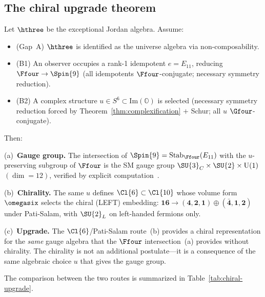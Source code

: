 \subsection{The chiral upgrade theorem}\label{sec:chiral-upgrade}

\begin{theorem}\label{thm:one-choice}
Let $\hthree$ be the exceptional Jordan algebra.  Assume:
\begin{itemize}
  \item \textup{(Gap~A)} $\hthree$ is identified as the universe
    algebra via non-composability.
  \item \textup{(B1)} An observer occupies a rank-1
    idempotent $e = E_{11}$, reducing $\Ffour\to\Spin{9}$
    (all idempotents $\Ffour$-conjugate; necessary symmetry
    reduction).
  \item \textup{(B2)} A complex structure
    $u\in S^6\subset\mathrm{Im}(\mathbb{O})$ is selected
    (necessary symmetry reduction forced by
    Theorem~\ref{thm:complexification} $+$ Schur;
    all $u$ $\Gfour$-conjugate).
\end{itemize}
Then:

\noindent\textup{(a)~\textbf{Gauge group.}}\enspace
The intersection of $\Spin{9} = \mathrm{Stab}_{\Ffour}(E_{11})$
with the $u$-preserving subgroup of $\Ffour$ is the SM gauge
group $\SU{3}_C\times\SU{2}\times\mathrm{U}(1)$ $(\dim = 12)$,
verified by explicit computation~\cite{TodorovDrenska2018}.

\noindent\textup{(b)~\textbf{Chirality.}}\enspace
The same $u$ defines $\Cl{6}\subset\Cl{10}$ whose volume form
$\omegasix$ selects the chiral \textup{(LEFT)} embedding:
$\mathbf{16}\to(\mathbf{4},\mathbf{2},\mathbf{1})\oplus
(\bar{\mathbf{4}},\mathbf{1},\mathbf{2})$ under Pati-Salam,
with $\SU{2}_L$ on left-handed fermions only.

\noindent\textup{(c)~\textbf{Upgrade.}}\enspace
The $\Cl{6}$/Pati-Salam route~\textup{(b)} provides a chiral
representation for the \emph{same} gauge algebra that the $\Ffour$
intersection~\textup{(a)} provides without chirality.  The
chirality is not an additional postulate---it is a consequence of
the same algebraic choice $u$ that gives the gauge group.
\end{theorem}

The comparison between the two routes is summarized in
Table~\ref{tab:chiral-upgrade}.


